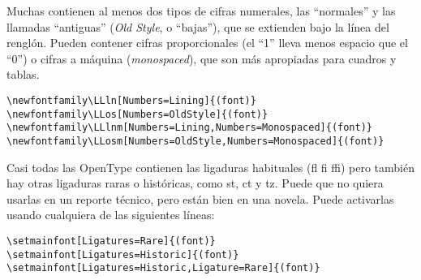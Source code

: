 

Muchas \fontsnomo{} contienen al menos dos tipos de cifras numerales,
las ``normales'' y las llamadas ``antiguas'' (\emph{Old Style}, o ``bajas''), que se extienden bajo la línea del renglón.
Pueden contener cifras proporcionales (el ``1'' lleva menos espacio que el ``0'') o cifras a máquina (\emph{monospaced}), que son más apropiadas para cuadros y tablas.

\begin{code}
\begin{verbatim}
\newfontfamily\LLln[Numbers=Lining]{(font)}
\newfontfamily\LLos[Numbers=OldStyle]{(font)}
\newfontfamily\LLlnm[Numbers=Lining,Numbers=Monospaced]{(font)}
\newfontfamily\LLosm[Numbers=OldStyle,Numbers=Monospaced]{(font)}
\end{verbatim}
\end{code}


Casi todas las \fontsnomo{} OpenType contienen las ligaduras habituales
(fl fi ffi) pero también hay otras ligaduras raras o históricas, como st, ct y tz. 
Puede que no quiera usarlas en un reporte técnico, pero están bien en una novela. 
Puede activarlas usando cualquiera de las siguientes líneas:

\begin{code}
\begin{verbatim}
\setmainfont[Ligatures=Rare]{(font)}
\setmainfont[Ligatures=Historic]{(font)}
\setmainfont[Ligatures=Historic,Ligature=Rare]{(font)}
\end{verbatim}
\end{code}

